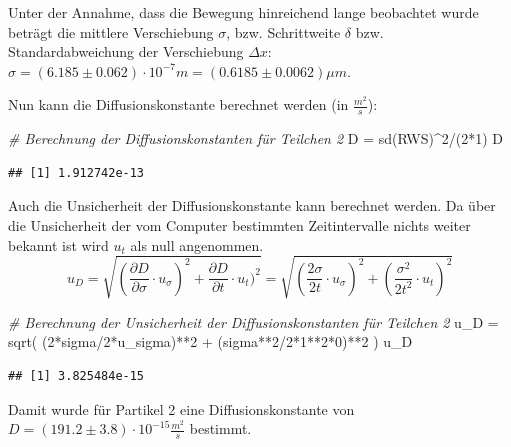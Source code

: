 \documentclass[
  9pt,
]{article}
\newenvironment{Shaded}{\begin{snugshade}}{\end{snugshade}}
\newcommand{\CommentTok}[1]{\textcolor[rgb]{0.56,0.35,0.01}{\textit{#1}}}
\newcommand{\DecValTok}[1]{\textcolor[rgb]{0.00,0.00,0.81}{#1}}
\newcommand{\FunctionTok}[1]{\textcolor[rgb]{0.00,0.00,0.00}{#1}}
\newcommand{\NormalTok}[1]{#1}
\newcommand{\OtherTok}[1]{\textcolor[rgb]{0.56,0.35,0.01}{#1}}
\newcommand{\SpecialCharTok}[1]{\textcolor[rgb]{0.00,0.00,0.00}{#1}}
\begin{document}
Unter der Annahme, dass die Bewegung hinreichend lange beobachtet wurde
beträgt die mittlere Verschiebung \(\sigma\), bzw. Schrittweite
\(\delta\) bzw. Standardabweichung der Verschiebung \(\Delta x\):
\(\sigma = (6.185 \pm 0.062 )\cdot 10^{-7}m = (0.6185 \pm 0.0062 )\mu m\).

Nun kann die Diffusionskonstante berechnet werden (in
\(\frac{m^2}{s}\)):

\begin{Shaded}
\begin{Highlighting}[]
\CommentTok{\# Berechnung der Diffusionskonstanten für Teilchen 2}
\NormalTok{D }\OtherTok{=} \FunctionTok{sd}\NormalTok{(RWS)}\SpecialCharTok{\^{}}\DecValTok{2}\SpecialCharTok{/}\NormalTok{(}\DecValTok{2}\SpecialCharTok{*}\DecValTok{1}\NormalTok{)}
\NormalTok{D}
\end{Highlighting}
\end{Shaded}

\begin{verbatim}
## [1] 1.912742e-13
\end{verbatim}

Auch die Unsicherheit der Diffusionskonstante kann berechnet werden. Da
über die Unsicherheit der vom Computer bestimmten Zeitintervalle nichts
weiter bekannt ist wird \(u_t\) als null angenommen.
\[u_D = \sqrt{(\frac{\partial D}{\partial \sigma}\cdot u_{\sigma})^2 + \frac{\partial D}{\partial t}\cdot u_{t})^2}= \sqrt{(\frac{2\sigma}{2t}\cdot u_{\sigma})^2+(\frac{\sigma^2}{2t^2}\cdot u_t)^2}\]

\begin{Shaded}
\begin{Highlighting}[]
\CommentTok{\# Berechnung der Unsicherheit der Diffusionskonstanten für Teilchen 2}
\NormalTok{u\_D }\OtherTok{=} \FunctionTok{sqrt}\NormalTok{( (}\DecValTok{2}\SpecialCharTok{*}\NormalTok{sigma}\SpecialCharTok{/}\DecValTok{2}\SpecialCharTok{*}\NormalTok{u\_sigma)}\SpecialCharTok{**}\DecValTok{2} \SpecialCharTok{+}\NormalTok{ (sigma}\SpecialCharTok{**}\DecValTok{2}\SpecialCharTok{/}\DecValTok{2}\SpecialCharTok{*}\DecValTok{1}\SpecialCharTok{**}\DecValTok{2}\SpecialCharTok{*}\DecValTok{0}\NormalTok{)}\SpecialCharTok{**}\DecValTok{2}\NormalTok{ )}
\NormalTok{u\_D}
\end{Highlighting}
\end{Shaded}

\begin{verbatim}
## [1] 3.825484e-15
\end{verbatim}

Damit wurde für Partikel 2 eine Diffusionskonstante von
\(D=(191.2 \pm 3.8)\cdot 10^{-15} \frac{m^2}{s}\) bestimmt.
\end{document}
